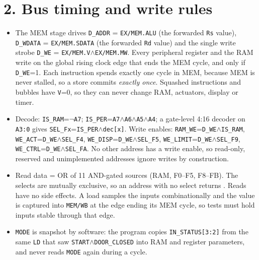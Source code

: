 \documentclass[10pt,a4paper]{article}
\begin{document}
\section*{2. Bus timing and write rules}
\begin{itemize}
\item The MEM stage drives \texttt{D\_ADDR} = \texttt{EX/MEM.ALU} (the forwarded \texttt{Rs} value), \texttt{D\_WDATA} =
  \texttt{EX/MEM.SDATA} (the forwarded \texttt{Rd} value) and the single write strobe
  \texttt{D\_WE} = \texttt{EX/MEM.V}$\wedge$\texttt{EX/MEM.MW}. Every peripheral register and the RAM write on the global rising
  clock edge that ends the MEM cycle, and only if \texttt{D\_WE}=1. Each instruction spends exactly one cycle in MEM, because
  MEM is never stalled, so a store commits \emph{exactly once}. Squashed instructions and bubbles have \texttt{V}=0, so they
  can never change RAM, actuators, display or timer.
\item Decode: \texttt{IS\_RAM}=$\lnot$\texttt{A7}; \texttt{IS\_PER}=\texttt{A7}$\wedge$\texttt{A6}$\wedge$\texttt{A5}$\wedge$\texttt{A4};
  a gate-level 4:16 decoder on \texttt{A3:0} gives \texttt{SEL\_Fx}=\texttt{IS\_PER}$\wedge$\texttt{dec[x]}.
  Write enables: \texttt{RAM\_WE}=\texttt{D\_WE}$\wedge$\texttt{IS\_RAM}, \texttt{WE\_ACT}=\texttt{D\_WE}$\wedge$\texttt{SEL\_F4},
  \texttt{WE\_DISP}=\texttt{D\_WE}$\wedge$\texttt{SEL\_F5}, \texttt{WE\_LIMIT}=\texttt{D\_WE}$\wedge$\texttt{SEL\_F9},
  \texttt{WE\_CTRL}=\texttt{D\_WE}$\wedge$\texttt{SEL\_FA}. No other address has a write enable, so read-only, reserved and
  unimplemented addresses ignore writes by construction.
\item Read data = OR of 11 AND-gated sources (RAM, F0--F5, F8--FB). The selects are mutually exclusive, so an
  address with no select returns . Reads have no side effects. A load samples the inputs combinationally and the value is
  captured into \texttt{MEM/WB} at the edge ending its MEM cycle, so tests must hold inputs stable through that edge.
\item \texttt{MODE} is snapshot by software: the program copies \texttt{IN\_STATUS[3:2]} from the same \texttt{LD} that saw
  \texttt{START}$\wedge$\texttt{DOOR\_CLOSED} into RAM  and register parameters, and never reads \texttt{MODE} again during a cycle.
\end{itemize}
\end{document}
